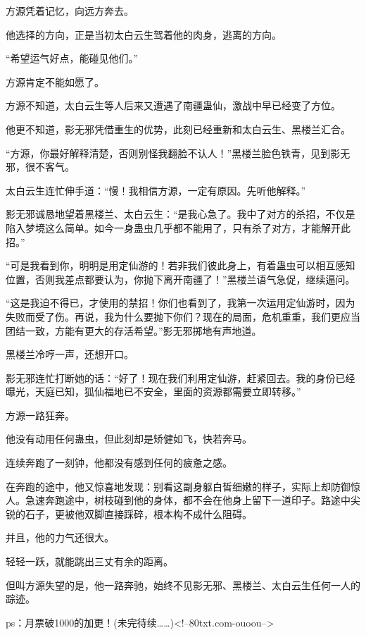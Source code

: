 \begin{this_body}
方源凭着记忆，向远方奔去。

他选择的方向，正是当初太白云生驾着他的肉身，逃离的方向。

“希望运气好点，能碰见他们。”

方源肯定不能如愿了。

方源不知道，太白云生等人后来又遭遇了南疆蛊仙，激战中早已经变了方位。

他更不知道，影无邪凭借重生的优势，此刻已经重新和太白云生、黑楼兰汇合。

“方源，你最好解释清楚，否则别怪我翻脸不认人！”黑楼兰脸色铁青，见到影无邪，很不客气。

太白云生连忙伸手道：“慢！我相信方源，一定有原因。先听他解释。”

影无邪诚恳地望着黑楼兰、太白云生：“是我心急了。我中了对方的杀招，不仅是陷入梦境这么简单。如今一身蛊虫几乎都不能用了，只有杀了对方，才能解开此招。”

“可是我看到你，明明是用定仙游的！若非我们彼此身上，有着蛊虫可以相互感知位置，否则我差点都要认为，你抛下离开南疆了！”黑楼兰语气急促，继续逼问。

“这是我迫不得已，才使用的禁招！你们也看到了，我第一次运用定仙游时，因为失败而受了伤。再说，我为什么要抛下你们？现在的局面，危机重重，我们更应当团结一致，方能有更大的存活希望。”影无邪掷地有声地道。

黑楼兰冷哼一声，还想开口。

影无邪连忙打断她的话：“好了！现在我们利用定仙游，赶紧回去。我的身份已经曝光，天庭已知，狐仙福地已不安全，里面的资源都需要立即转移。”

方源一路狂奔。

他没有动用任何蛊虫，但此刻却是矫健如飞，快若奔马。

连续奔跑了一刻钟，他都没有感到任何的疲惫之感。

在奔跑的途中，他又惊喜地发现：别看这副身躯白皙细嫩的样子，实际上却防御惊人。急速奔跑途中，树枝碰到他的身体，都不会在他身上留下一道印子。路途中尖锐的石子，更被他双脚直接踩碎，根本构不成什么阻碍。

并且，他的力气还很大。

轻轻一跃，就能跳出三丈有余的距离。

但叫方源失望的是，他一路奔驰，始终不见影无邪、黑楼兰、太白云生任何一人的踪迹。

ps：月票破1000的加更！(未完待续……)<!--80txt.com-ouoou-->

\end{this_body}


